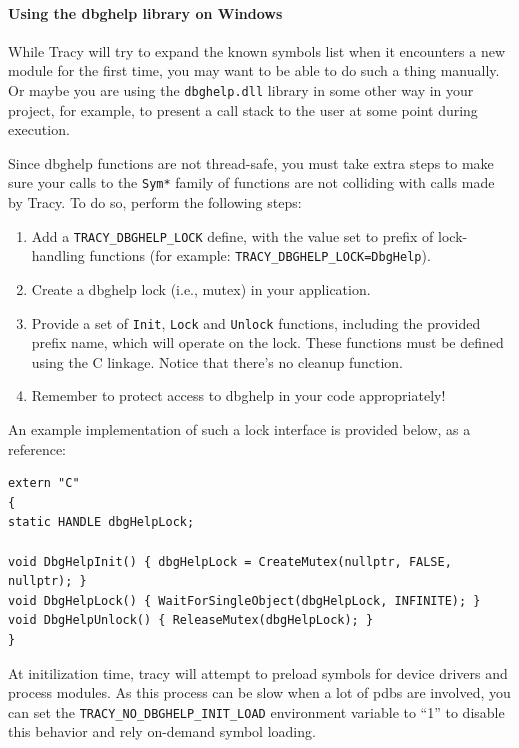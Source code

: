 \documentclass[hidelinks,titlepage,a4paper,twoside]{article}
\begin{document}
\paragraph{Using the dbghelp library on Windows}

While Tracy will try to expand the known symbols list when it encounters a new module for the first time, you may want to be able to do such a thing manually. Or maybe you are using the \texttt{dbghelp.dll} library in some other way in your project, for example, to present a call stack to the user at some point during execution.

Since dbghelp functions are not thread-safe, you must take extra steps to make sure your calls to the \texttt{Sym*} family of functions are not colliding with calls made by Tracy. To do so, perform the following steps:

\begin{enumerate}
\item Add a \texttt{TRACY\_DBGHELP\_LOCK} define, with the value set to prefix of lock-handling functions (for example: \texttt{TRACY\_DBGHELP\_LOCK=DbgHelp}).
\item Create a dbghelp lock (i.e., mutex) in your application.
\item Provide a set of \texttt{Init}, \texttt{Lock} and \texttt{Unlock} functions, including the provided prefix name, which will operate on the lock. These functions must be defined using the C linkage. Notice that there's no cleanup function.
\item Remember to protect access to dbghelp in your code appropriately!
\end{enumerate}

An example implementation of such a lock interface is provided below, as a reference:

\begin{lstlisting}
extern "C"
{
static HANDLE dbgHelpLock;

void DbgHelpInit() { dbgHelpLock = CreateMutex(nullptr, FALSE, nullptr); }
void DbgHelpLock() { WaitForSingleObject(dbgHelpLock, INFINITE); }
void DbgHelpUnlock() { ReleaseMutex(dbgHelpLock); }
}
\end{lstlisting}

At initilization time, tracy will attempt to preload symbols for device drivers and process modules. As this process can be slow when a lot of pdbs are involved, you can set the \texttt{TRACY\_NO\_DBGHELP\_INIT\_LOAD} environment variable to \enquote{1} to disable this behavior and rely on-demand symbol loading.
\end{document}
